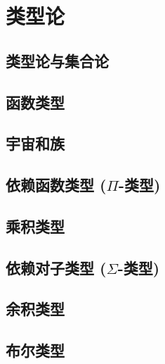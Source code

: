 \chapter{类型论}
\label{cha:typetheory}

\section{类型论与集合论}
\label{sec:types-vs-sets}


\section{函数类型}
\label{sec:function-types}


\section{宇宙和族}
\label{sec:universes}


\section{依赖函数类型 (\texorpdfstring{$\Pi$}{Π}-类型)}
\label{sec:pi-types}


\section{乘积类型}
\label{sec:finite-product-types}


\section{依赖对子类型 (\texorpdfstring{$\Sigma$}{Σ}-类型)}
\label{sec:sigma-types}


\section{余积类型}
\label{sec:coproduct-types}


\section{布尔类型}
\label{sec:type-booleans}


